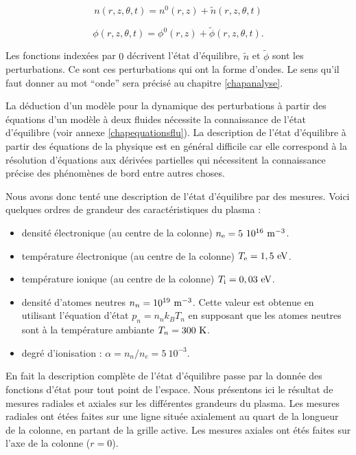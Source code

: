 \documentclass{book}
\begin{document}
\begin{equation}
n(r,z,\theta,t)=n^0(r,z)+\tilde{n}(r,z,\theta,t)
\end{equation}

\begin{equation}
\phi(r,z,\theta,t)=\phi^0(r,z)+\tilde{\phi}(r,z,\theta,t).
\end{equation}

Les fonctions index\'ees par $0$ d\'ecrivent l'\'etat d'\'equilibre,
$\tilde{n}$ et $\tilde{\phi}$ sont les perturbations. Ce sont ces
perturbations qui ont la forme d'ondes. Le sens qu'il faut donner au
mot ``onde'' sera pr\'ecis\'e au chapitre \ref{chapanalyse}.

La d\'eduction d'un mod\`ele pour la dynamique des perturbations \`a
partir des \'equations d'un mod\`ele \`a deux fluides
n\'ecessite 
la connaissance de l'\'etat d'\'equilibre (voir annexe
\ref{chapequationsflu}). La description de l'\'etat
d'\'equilibre \`a partir des \'equations de la physique est en
g\'en\'eral
difficile car elle correspond \`a la r\'esolution d'\'equations aux
d\'eriv\'ees 
partielles qui n\'ecessitent la connaissance pr\'ecise des
ph\'enom\`enes de 
bord entre autres choses.


Nous avons donc tent\'e une description de l'\'etat d'\'equilibre par des
mesures.
Voici quelques ordres de grandeur des caract\'eristiques du plasma :

\begin{itemize}
\item densit\'e \'electronique (au centre de la colonne)   $n_{\rm
e}=5\ 10^{16}\ {\rm m}^{-3}$.
\item temp\'erature \'electronique (au centre de la colonne)  $T_{\rm
e}=1,5\ {\rm eV}$.
\item temp\'erature ionique (au centre de la colonne)     $T_{\rm
i}=0,03\ {\rm eV}$.
\item densit\'e d'atomes  neutres $n_n=10^{19}\ {\rm m}^{-3}$. Cette
valeur est 
obtenue en utilisant l'\'equation d'\'etat $p_n=n_nk_BT_n$ en supposant
que les atomes neutres sont \`a la temp\'erature ambiante $T_n=300\
{\rm K}$.
\item degr\'e d'ionisation : $\alpha=n_n/n_e=5\ 10^{-3}$.
\end{itemize}

En fait la description compl\`ete de l'\'etat d'\'equilibre passe par la
donn\'ee des fonctions d'\'etat pour tout point de l'espace.
Nous pr\'esentons ici le r\'esultat de mesures radiales et axiales sur les
diff\'erentes grandeurs du plasma. Les mesures radiales ont \'et\'ees
faites sur une ligne situ\'ee axialement au quart de
la longueur de la colonne, en partant de la grille active.
Les mesures axiales ont \'et\'es faites sur l'axe de la colonne
($r=0$).
\end{document}
